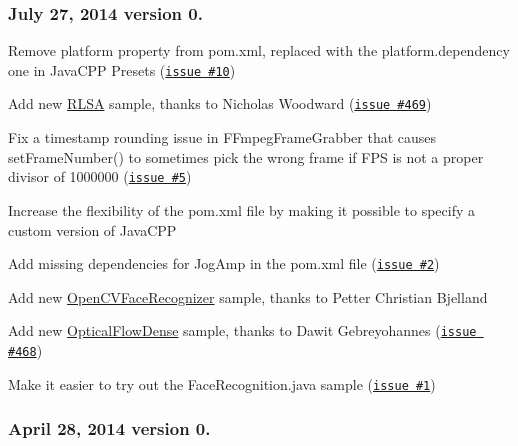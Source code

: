 \subsubsection*{July 27, 2014 version 0.}


\begin{DoxyItemize}
\item Remove {\ttfamily platform} property from {\ttfamily pom.\+xml}, replaced with the {\ttfamily platform.\+dependency} one in Java\+C\+P\+P Presets (\href{https://github.com/bytedeco/javacv/issues/10}{\tt issue \#10})
\item Add new {\ttfamily \hyperlink{class_r_l_s_a}{R\+L\+S\+A}} sample, thanks to Nicholas Woodward (\href{http://code.google.com/p/javacv/issues/detail?id=469}{\tt issue \#469})
\item Fix a timestamp rounding issue in {\ttfamily F\+Fmpeg\+Frame\+Grabber} that causes {\ttfamily set\+Frame\+Number()} to sometimes pick the wrong frame if F\+P\+S is not a proper divisor of 1000000 (\href{https://github.com/bytedeco/javacv/issues/5}{\tt issue \#5})
\item Increase the flexibility of the {\ttfamily pom.\+xml} file by making it possible to specify a custom version of Java\+C\+P\+P
\item Add missing dependencies for Jog\+Amp in the {\ttfamily pom.\+xml} file (\href{https://github.com/bytedeco/javacv/issues/2}{\tt issue \#2})
\item Add new {\ttfamily \hyperlink{class_open_c_v_face_recognizer}{Open\+C\+V\+Face\+Recognizer}} sample, thanks to Petter Christian Bjelland
\item Add new {\ttfamily \hyperlink{class_optical_flow_dense}{Optical\+Flow\+Dense}} sample, thanks to Dawit Gebreyohannes (\href{http://code.google.com/p/javacv/issues/detail?id=468}{\tt issue \#468})
\item Make it easier to try out the {\ttfamily Face\+Recognition.\+java} sample (\href{https://github.com/bytedeco/javacv/issues/1}{\tt issue \#1})
\end{DoxyItemize}

\subsubsection*{April 28, 2014 version 0.}


